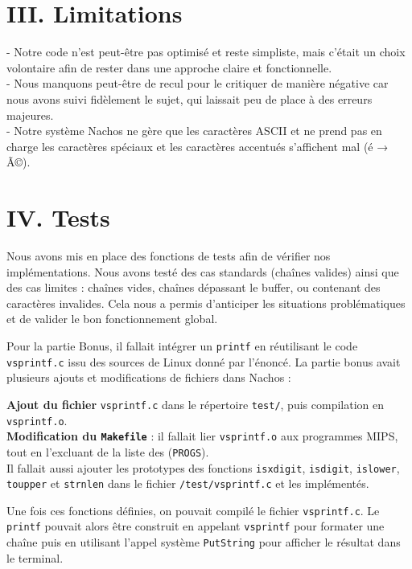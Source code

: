 \documentclass[12pt,a4paper]{report}
\begin{document}
\section*{III. Limitations}

- Notre code n'est peut-être pas optimisé et reste simpliste, mais c'était un choix volontaire afin de rester dans une approche claire et fonctionnelle. \\
- Nous manquons peut-être de recul pour le critiquer de manière négative car nous avons suivi fidèlement le sujet, qui laissait peu de place à des erreurs majeures. \\
- Notre système Nachos ne gère que les caractères ASCII et ne prend pas en charge les caractères spéciaux et les caractères accentués s’affichent mal (é → Ã©). \\

\section*{IV. Tests}

Nous avons mis en place des fonctions de tests afin de vérifier nos implémentations.  
Nous avons testé des cas standards (chaînes valides) ainsi que des cas limites : chaînes vides, chaînes dépassant le buffer, ou contenant des caractères invalides.  
Cela nous a permis d’anticiper les situations problématiques et de valider le bon fonctionnement global.

Pour la partie Bonus, il fallait intégrer un \texttt{printf} en réutilisant
le code \texttt{vsprintf.c} issu des sources de Linux donné par l'énoncé. 
La partie bonus avait plusieurs ajouts et modifications de fichiers dans Nachos :

\textbf{Ajout du fichier} \texttt{vsprintf.c} dans le répertoire \texttt{test/}, puis compilation en \texttt{vsprintf.o}. \\
\textbf{Modification du \texttt{Makefile}} : il fallait lier  \texttt{vsprintf.o} aux programmes MIPS,
tout en l’excluant de la liste des (\texttt{PROGS}). \\

Il fallait aussi ajouter les prototypes des fonctions \texttt{isxdigit}, \texttt{isdigit}, \texttt{islower}, \texttt{toupper} et \texttt{strnlen}
dans le fichier \texttt{/test/vsprintf.c} et les implémentés.

Une fois ces fonctions définies, on pouvait compilé le fichier \texttt{vsprintf.c}.
Le \texttt{printf} pouvait alors être construit en appelant \texttt{vsprintf} pour formater une chaîne
puis en utilisant l’appel système \texttt{PutString} pour afficher le résultat dans le terminal.
\end{document}
